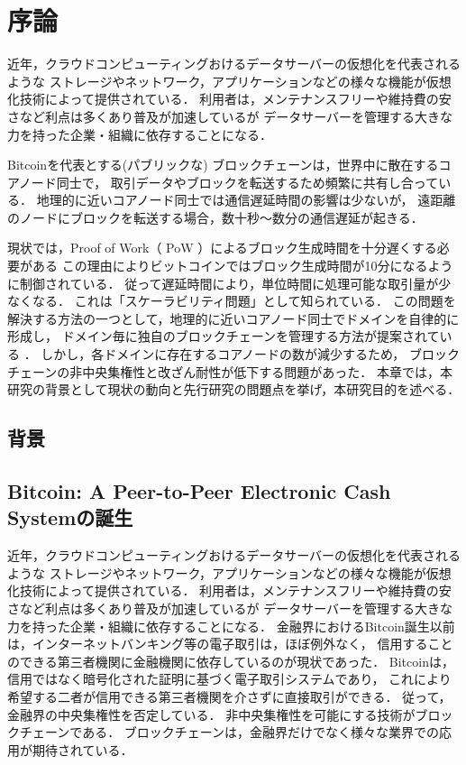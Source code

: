 \documentclass[a4paper,12pt]{jsarticle}
\begin{document}

\section{序論}
近年，クラウドコンピューティングおけるデータサーバーの仮想化を代表されるような
ストレージやネットワーク，アプリケーションなどの様々な機能が仮想化技術によって提供されている．
利用者は，メンテナンスフリーや維持費の安さなど利点は多くあり普及が加速しているが
データサーバーを管理する大きな力を持った企業・組織に依存することになる．

Bitcoinを代表とする(パブリックな) ブロックチェーンは，世界中に散在するコアノード同士で，
取引データやブロックを転送するため頻繁に共有し合っている．
地理的に近いコアノード同士では通信遅延時間の影響は少ないが，
遠距離のノードにブロックを転送する場合，数十秒〜数分の通信遅延が起きる．

現状では，Proof of Work（ PoW ）によるブロック生成時間を十分遅くする必要がある
この理由によりビットコインではブロック生成時間が10分になるように制御されている．
従って遅延時間により，単位時間に処理可能な取引量が少なくなる．
これは「スケーラビリティ問題」として知られている． 
この問題を解決する方法の一つとして，地理的に近いコアノード同士でドメインを自律的に形成し，
ドメイン毎に独自のブロックチェーンを管理する方法が提案されている \cite{fujihara1}\cite{fujihara2}．
しかし，各ドメインに存在するコアノードの数が減少するため，
ブロックチェーンの非中央集権性と改ざん耐性が低下する問題があった．
本章では，本研究の背景として現状の動向と先行研究の問題点を挙げ，本研究目的を述べる．


\subsection{背景}
\subsection{Bitcoin: A Peer-to-Peer Electronic Cash Systemの誕生}
近年，クラウドコンピューティングおけるデータサーバーの仮想化を代表されるような
ストレージやネットワーク，アプリケーションなどの様々な機能が仮想化技術によって提供されている．
利用者は，メンテナンスフリーや維持費の安さなど利点は多くあり普及が加速しているが
データサーバーを管理する大きな力を持った企業・組織に依存することになる．
金融界におけるBitcoin誕生以前は，インターネットバンキング等の電子取引は，ほぼ例外なく，
信用することのできる第三者機関に金融機関に依存しているのが現状であった．
Bitcoinは，信用ではなく暗号化された証明に基づく電子取引システムであり，
これにより希望する二者が信用できる第三者機関を介さずに直接取引ができる．
従って，金融界の中央集権性を否定している．
非中央集権性を可能にする技術がブロックチェーンである．
ブロックチェーンは，金融界だけでなく様々な業界での応用が期待されている．
\end{document}
